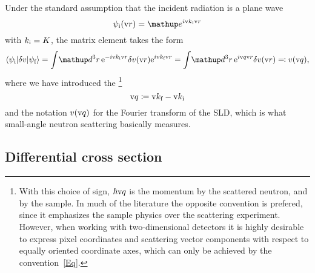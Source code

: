 Under the standard assumption
that the incident radiation is a plane wave
%
\begin{equation}\label{EPsi0Plane}
  \psi_\si(\r)=\e^{i \k_\si \r}
\end{equation}
with $k_{\text{i}}=K$,
the matrix element takes the form
\begin{equation}\label{Echiq}
  \bra \psi_\si|\delta v|\psi_\sf\ket
  = \int\!\d^3r\, {\rm e}^{-i\k_\si\r}\delta v(\r){\rm e}^{i\k_\sf\r}
  = \int\!\d^3r\, {\rm e}^{i\q\r}\delta v(\r)
  \eqqcolon v(\q),
\end{equation}
%
where we have introduced the \footnote
{With this choice of sign,
%
$\hbar\text{v}{q}$ is the momentum
%
 by the scattered neutron,
and  by the sample.
In much of the literature the opposite convention is prefered,
since it emphasizes the sample physics over the scattering experiment.
However, when working with two-dimensional detectors
it is highly desirable to express pixel coordinates
and scattering vector components
with respect to equally oriented coordinate axes,
which can only be achieved by the convention~\cref{Eq}.}
%
\begin{equation}\label{Eq}
  \text{v}{q}\coloneqq \text{v}{k}_{\text{f}}-\text{v}{k}_{\text{i}}
\end{equation}
%
and the notation $v(\text{v}{q})$ for
the Fourier transform of the SLD,
%
which is what small-angle neutron scattering basically measures.

%


\subsection{Differential cross section}\label{SdiffCross}

